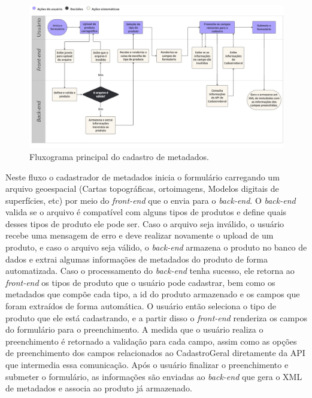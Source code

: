 \begin{figure}[H] %
    \centering
    \includegraphics[width=1\linewidth]{img/fluxograma_da_solucao.jpg}
    \caption{Fluxograma principal do cadastro de metadados.}
    \label{fig:fluxograma_da_solucao} %
\end{figure}

Neste fluxo o cadastrador de metadados inicia o formulário carregando um arquivo geoespacial (Cartas topográficas, ortoimagens, Modelos digitais de superfícies, etc) por meio do \textit{front-end} que o envia para o \textit{back-end}. O \textit{back-end} valida se o arquivo é compatível com alguns tipos de produtos e define quais desses tipos de produto ele pode ser. Caso o arquivo seja inválido, o usuário recebe uma mensagem de erro e deve realizar novamente o upload de um produto, e caso o arquivo seja válido, o \textit{back-end} armazena o produto no banco de dados e extrai algumas informações de metadados do produto de forma automatizada. Caso o processamento do \textit{back-end} tenha sucesso, ele retorna ao \textit{front-end} os tipos de produto que o usuário pode cadastrar, bem como os metadados que compõe cada tipo, a id do produto armazenado e os campos que foram extraídos de forma automática. O usuário então seleciona o tipo de produto que ele está cadastrando, e a partir disso o \textit{front-end} renderiza os campos do formulário para o preenchimento. A medida que o usuário realiza o preenchimento é retornado a validação para cada campo, assim como as opções de preenchimento dos campos relacionados ao CadastroGeral diretamente da API que intermedia essa comunicação. Após o usuário finalizar o preenchimento e submeter o formulário, as informações são enviadas ao \textit{back-end} que gera o XML de metadados e associa ao produto já armazenado.

